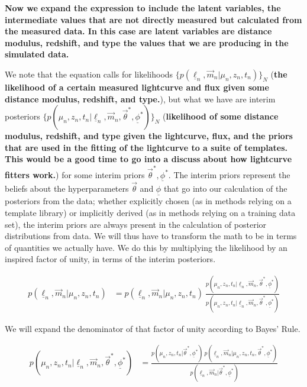 \documentclass[12pt, onecolumn]{emulateapj}
\newcommand{\textul}{\underline}
\begin{document}
{\bf Now we expand the expression to include the latent variables, the intermediate values that are not directly measured but calculated from the measured data. In this case are latent variables are distance modulus, redshift, and type the values that we are producing in the simulated data.}

We note that the equation calls for likelihoods $\{p(\textul{\ell}_{n}, \vec{m}_{n} | \mu_{n}, z_{n}, t_{n})\}_{N}$ ({\bf the likelihood of a certain measured lightcurve and flux given some distance modulus, redshift, and type.}), but what we have are interim posteriors $\{p(\mu_{n}, z_{n}, t_{n} | \textul{\ell}_{n}, \vec{m}_{n}, \vec{\theta}^{*}, \textul{\phi}^{*})\}_{N}$ ({\bf likelihood of some distance modulus, redshift, and type given the lightcurve, flux, and the priors that are used in the fitting of the lightcurve to a suite of templates. This would be a good time to go into a discuss about how lightcurve fitters work.}) for some interim priors $\vec{\theta}^{*}, \textul{\phi}^{*}$.  The interim priors represent the beliefs about the hyperparameters $\vec{\theta}$ and $\textul{\phi}$ that go into our calculation of the posteriors from the data; whether explicitly chosen (as in methods relying on a template library) or implicitly derived (as in methods relying on a training data set), the interim priors are always present in the calculation of posterior distributions from data.  We will thus have to transform the math to be in terms of quantities we actually have.  We do this by multiplying the likelihood by an inspired factor of unity, in terms of the interim posteriors.

\begin{align}
p(\textul{\ell}_{n}, \vec{m}_{n} | \mu_{n}, z_{n}, t_{n}) &= p(\textul{\ell}_{n}, \vec{m}_{n} | \mu_{n}, z_{n}, t_{n})\ \frac{p(\mu_{n}, z_{n}, t_{n} | \textul{\ell}_{n}, \vec{m}_{n}, \vec{\theta}^{*}, \textul{\phi}^{*})}{p(\mu_{n}, z_{n}, t_{n} | \textul{\ell}_{n}, \vec{m}_{n}, \vec{\theta}^{*}, \textul{\phi}^{*})}
\end{align}

We will expand the denominator of that factor of unity according to Bayes' Rule.

\begin{align}
p(\mu_{n}, z_{n}, t_{n}|\textul{\ell}_{n}, \vec{m}_{n}, \vec{\theta}^{*}, \textul{\phi}^{*}) &= \frac{p(\mu_{n}, z_{n}, t_{n} | \vec{\theta}^{*}, \textul{\phi}^{*})\ p(\textul{\ell}_{n}, \vec{m}_{n} | \mu_{n}, z_{n}, t_{n}, \vec{\theta}^{*}, \textul{\phi}^{*})}{p(\textul{\ell}_{n}, \vec{m}_{n} | \vec{\theta}^{*}, \textul{\phi}^{*})}
\end{align}
\end{document}
